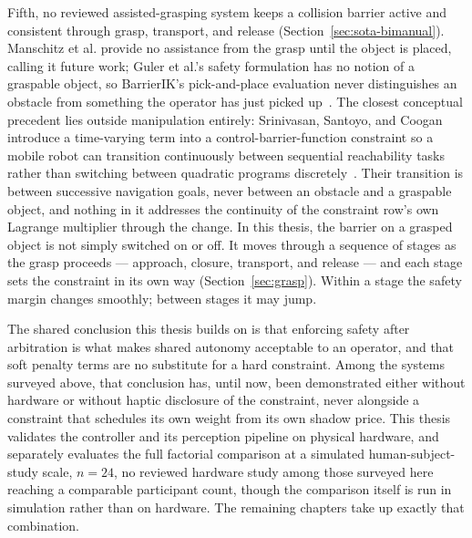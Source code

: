 Fifth, no reviewed assisted-grasping system keeps a collision barrier active and consistent through grasp, transport, and release (Section~\ref{sec:sota-bimanual}). Manschitz et al. provide no assistance from the grasp until the object is placed, calling it future work; Guler et al.'s safety formulation has no notion of a graspable object, so BarrierIK's pick-and-place evaluation never distinguishes an obstacle from something the operator has just picked up~\cite{manschitz2025samplinggrasp,guler2026barrierik}. The closest conceptual precedent lies outside manipulation entirely: Srinivasan, Santoyo, and Coogan introduce a time-varying term into a control-barrier-function constraint so a mobile robot can transition continuously between sequential reachability tasks rather than switching between quadratic programs discretely~\cite{srinivasan2020continuous}. Their transition is between successive navigation goals, never between an obstacle and a graspable object, and nothing in it addresses the continuity of the constraint row's own Lagrange multiplier through the change. In this thesis, the barrier on a grasped object is not simply switched on or off. It moves through a sequence of stages as the grasp proceeds --- approach, closure, transport, and release --- and each stage sets the constraint in its own way (Section~\ref{sec:grasp}). Within a stage the safety margin changes smoothly; between stages it may jump.



The shared conclusion this thesis builds on is that enforcing safety after arbitration is what makes shared autonomy acceptable to an operator, and that soft penalty terms are no substitute for a hard constraint. Among the systems surveyed above, that conclusion has, until now, been demonstrated either without hardware or without haptic disclosure of the constraint, never alongside a constraint that schedules its own weight from its own shadow price. This thesis validates the controller and its perception pipeline on physical hardware, and separately evaluates the full factorial comparison at a simulated human-subject-study scale, $n=24$, no reviewed hardware study among those surveyed here reaching a comparable participant count, though the comparison itself is run in simulation rather than on hardware. The remaining chapters take up exactly that combination.


